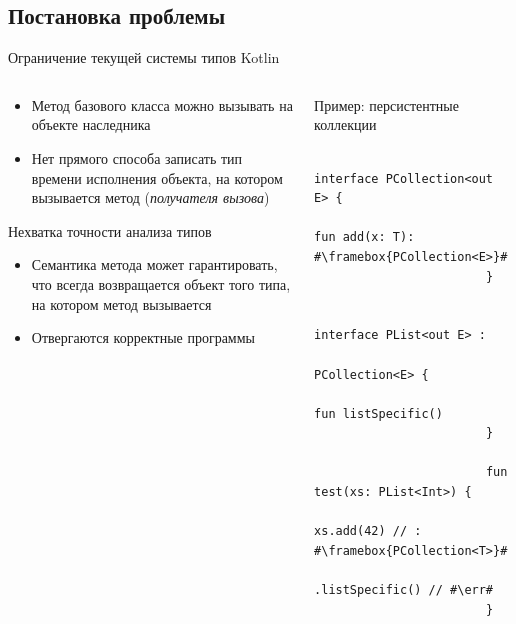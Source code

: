 \documentclass[usenames, dvipsnames]{beamer}
\newcommand{\err}[0]{\textcolor{red}{ошибка}}
\begin{document}
    \subsection{Постановка проблемы}

    \begin{frame}[fragile]{Ограничение текущей системы типов Kotlin}
        \vspace{-1em}
        \begin{columns}[onlytextwidth]
            \begin{column}[t]{0.5\textwidth}
                \begin{itemize}
                    \item Метод базового класса можно вызывать на объекте наследника
                    \item Нет прямого способа записать тип времени исполнения объекта, на котором вызывается метод (\emph{получателя вызова})
                \end{itemize}
                \begin{block}{Нехватка точности анализа типов}
                    \begin{itemize}
                        \item Семантика метода может гарантировать, что всегда возвращается объект того типа, на котором метод вызывается
                        \item Отвергаются корректные программы
                    \end{itemize}
                \end{block}
            \end{column}\hfill%
            \begin{column}[t]{0.460\textwidth}
                \begin{block}{Пример: персистентные коллекции}
                    \begin{verbatim}
                        interface PCollection<out E> {
                            fun add(x: T): #\framebox{PCollection<E>}#
                        }

                        interface PList<out E> :
                            PCollection<E> {
                            fun listSpecific()
                        }

                        fun test(xs: PList<Int>) {
                            xs.add(42) // : #\framebox{PCollection<T>}#
                              .listSpecific() // #\err#
                        }
                    \end{verbatim}
                \end{block}
            \end{column}
        \end{columns}
    \end{frame}
\end{document}
